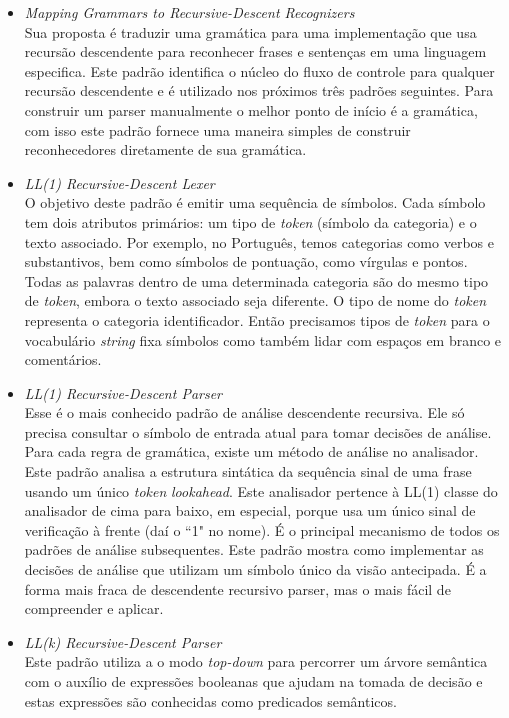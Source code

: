 \begin{itemize}
	\item \emph{Mapping Grammars to Recursive-Descent Recognizers}\\

	Sua proposta \'{e} traduzir uma gram\'{a}tica para uma implementa\c c\~{a}o que usa recurs\~{a}o descendente 
para reconhecer frases e sentenças em uma linguagem especifica. Este padr\~{a}o identifica o n\'{u}cleo do fluxo de controle 
para qualquer recurs\~{a}o descendente e \'{e} utilizado nos pr\'{o}ximos tr\^{e}s 
padr\~{o}es seguintes. Para construir um parser
manualmente o melhor ponto de in\'{i}cio \'{e} a gram\'{a}tica, com isso este padr\~{a}o fornece uma maneira simples de construir reconhecedores diretamente de sua gram\'{a}tica.
	
	\item \emph{LL(1) Recursive-Descent Lexer}\\

	O objetivo deste padr\~{a}o \'{e} emitir uma sequência de s\'{i}mbolos. Cada s\'{i}mbolo tem dois atributos prim\'{a}rios: 
um tipo de \textit{token} (s\'{i}mbolo da categoria) e o texto associado. Por exemplo, 
	no Português, temos categorias como verbos e substantivos, bem como s\'{i}mbolos de pontuaç\~{a}o, como v\'{i}rgulas e pontos. Todas as palavras dentro de uma determinada categoria s\~{a}o do mesmo tipo de \textit{token}, embora o texto associado seja diferente. O tipo de nome do \textit{token} representa o categoria identificador. Ent\~{a}o precisamos tipos de \textit{token} para o vocabul\'{a}rio \textit{string} fixa s\'{i}mbolos como tamb\'{e}m lidar com espaços em branco e coment\'{a}rios.

	\item \emph{LL(1) Recursive-Descent Parser}\\
	Esse \'{e} o mais conhecido padr\~{a}o de an\'{a}lise descendente recursiva. Ele s\'{o} precisa	consultar o s\'{i}mbolo de entrada atual para tomar decis\~{o}es de an\'{a}lise. Para cada regra de gram\'{a}tica, existe um m\'{e}todo de an\'{a}lise no analisador. Este padr\~{a}o analisa a estrutura sint\'{a}tica da sequência sinal de uma frase usando um \'{u}nico \textit{token} \textit{lookahead}. Este analisador pertence à LL(1) classe do analisador de cima para baixo, em especial, porque usa um \'{u}nico sinal de verificaç\~{a}o à frente (da\'{i} 
o ``1" no nome). É o principal mecanismo de todos os padr\~{o}es de an\'{a}lise subsequentes. Este padr\~{a}o mostra 
como implementar as decis\~{o}es de an\'{a}lise que utilizam um s\'{i}mbolo \'{u}nico da vis\~{a}o antecipada. 
É a forma mais fraca de descendente recursivo parser, mas o mais f\'{a}cil de compreender e aplicar.

	\item \emph{LL(k) Recursive-Descent Parser}\\
	Este padr\~{a}o utiliza a o modo \textit{top-down} para percorrer um \'{a}rvore sem\^{a}ntica com o aux\'{i}lio de express\~{o}es booleanas que ajudam na tomada de decis\~{a}o e estas express\~{o}es s\~{a}o conhecidas como predicados sem\^{a}nticos.
	
\end{itemize}



